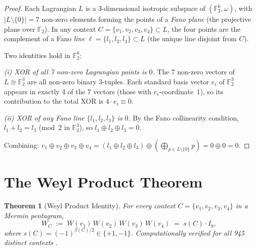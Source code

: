 \documentclass[11pt,a4paper]{article}
\newtheorem{theorem}{Theorem}[section]
\theoremstyle{remark}
\begin{document}
\begin{proof}
Each Lagrangian $L$ is a 3-dimensional isotropic subspace of
$(\mathbb{F}_2^6, \omega)$, with $|L \setminus \{0\}| = 7$ non-zero elements
forming the points of a \emph{Fano plane} (the projective plane over $\mathbb{F}_2$).
In any context $C = \{v_1, v_2, v_3, v_4\} \subset L$,
the four points are the complement of a Fano \emph{line}
$\ell = \{l_1, l_2, l_3\} \subset L$ (the unique line disjoint from $C$).

Two identities hold in $\mathbb{F}_2^6$:

\noindent
\emph{(i) XOR of all 7 non-zero Lagrangian points is $0$.}
The 7 non-zero vectors of $L \cong \mathbb{F}_2^3$ are all non-zero binary 3-tuples.
Each standard basis vector $e_i$ of $\mathbb{F}_2^3$ appears in exactly 4
of the 7 vectors (those with $e_i$-coordinate~1), so its contribution
to the total XOR is $4 \cdot e_i \equiv 0$.

\noindent
\emph{(ii) XOR of any Fano line $\{l_1, l_2, l_3\}$ is $0$.}
By the Fano collinearity condition, $l_1 + l_2 = l_3$
(mod~2 in $\mathbb{F}_2^3$), so $l_1 \oplus l_2 \oplus l_3 = 0$.

Combining: $v_1 \oplus v_2 \oplus v_3 \oplus v_4
= (l_1 \oplus l_2 \oplus l_3) \oplus (\bigoplus_{p \in L \setminus \{0\}} p)
= 0 \oplus 0 = 0$.
\end{proof}


\section{The Weyl Product Theorem}\label{sec:main}

\begin{theorem}[Weyl Product Identity]\label{thm:weyl}
For every context $C = \{v_1, v_2, v_3, v_4\}$ in a Mermin pentagram,
\[
  W_C \;:=\; W(v_1)\,W(v_2)\,W(v_3)\,W(v_4) \;=\; s(C) \cdot I_8,
\]
where $s(C) = (-1)^{\beta(C)/2} \in \{+1, -1\}$.
Computationally verified for all 945 distinct contexts \cite{PaperXVIsuppl}.
\end{theorem}
\end{document}
